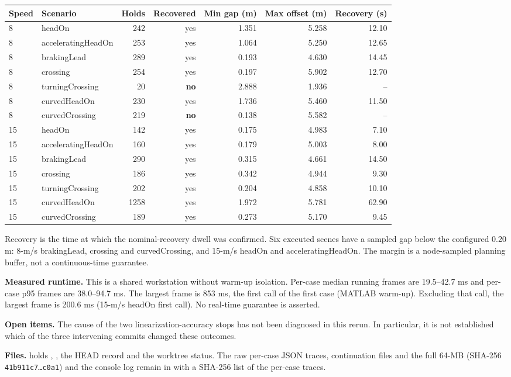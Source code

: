\documentclass[11pt]{article}
\begin{document}
\begin{center}
\begin{tabular}{llrrrrr}
\toprule
Speed & Scenario & Holds & Recovered & Min gap (m) & Max offset (m) & Recovery (s)\\
\midrule
8 & headOn & 242 & yes & 1.351 & 5.258 & 12.10\\
8 & acceleratingHeadOn & 253 & yes & 1.064 & 5.250 & 12.65\\
8 & brakingLead & 289 & yes & 0.193 & 4.630 & 14.45\\
8 & crossing & 254 & yes & 0.197 & 5.902 & 12.70\\
8 & turningCrossing & 20 & \textbf{no} & 2.888 & 1.936 & --\\
8 & curvedHeadOn & 230 & yes & 1.736 & 5.460 & 11.50\\
8 & curvedCrossing & 219 & \textbf{no} & 0.138 & 5.582 & --\\
15 & headOn & 142 & yes & 0.175 & 4.983 & 7.10\\
15 & acceleratingHeadOn & 160 & yes & 0.179 & 5.003 & 8.00\\
15 & brakingLead & 290 & yes & 0.315 & 4.661 & 14.50\\
15 & crossing & 186 & yes & 0.342 & 4.944 & 9.30\\
15 & turningCrossing & 202 & yes & 0.204 & 4.858 & 10.10\\
15 & curvedHeadOn & 1258 & yes & 1.972 & 5.781 & 62.90\\
15 & curvedCrossing & 189 & yes & 0.273 & 5.170 & 9.45\\
\bottomrule
\end{tabular}
\end{center}

Recovery is the time at which the nominal-recovery dwell was confirmed. Six
executed scenes have a sampled gap below the configured 0.20 m: 8-m/s
brakingLead, crossing and curvedCrossing, and 15-m/s headOn and
acceleratingHeadOn. The margin is a node-sampled planning buffer, not a
continuous-time guarantee.

\textbf{Measured runtime.} This is a shared workstation without warm-up
isolation. Per-case median running frames are 19.5--42.7 ms and per-case p95
frames are 38.0--94.7 ms. The largest frame is 853 ms, the first call of the
first case (MATLAB warm-up). Excluding that call, the largest frame is
200.6 ms (15-m/s headOn first call). No real-time guarantee is asserted.

\textbf{Open items.} The cause of the two linearization-accuracy stops has not
been diagnosed in this rerun. In particular, it is not established which of
the three intervening commits changed these outcomes.

\textbf{Files.}  holds ,
, the HEAD record and the worktree
status. The raw per-case JSON traces, continuation files and the full
64-MB  (SHA-256 \texttt{41b911c7\ldots c0a1}) and the console log remain in
 with a
SHA-256 list of the per-case traces.
\end{document}
